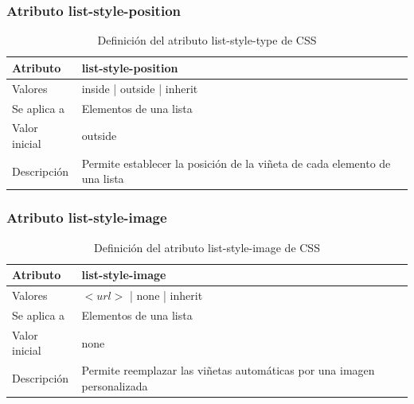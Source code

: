 \documentclass[ucs]{beamer}
\begin{document}

\begin{frame}
\frametitle{Atributo list-style-position}

\begin{center}
  \begin{table}
   \begin{tabular}{p{1.8cm}p{7.8cm}}
Atributo & \bf{list-style-position} \\ \hline
Valores& inside | outside | inherit \\ \hline
Se aplica a& Elementos de una lista \\ \hline
Valor inicial& outside \\ \hline
Descripción& Permite establecer la posición de la viñeta de cada elemento de una lista \\ \hline
  \end{tabular}
   \caption{Definición del atributo list-style-type de CSS}
 \end{table}
\end{center}


\end{frame}



\begin{frame}
\frametitle{Atributo list-style-image}

\begin{center}
  \begin{table}
   \begin{tabular}{p{1.8cm}p{7.8cm}}
Atributo & \bf{list-style-image} \\ \hline
Valores& $<url>$ | none | inherit \\ \hline
Se aplica a& Elementos de una lista \\ \hline
Valor inicial& none \\ \hline
Descripción& Permite reemplazar las viñetas automáticas por una imagen personalizada \\ \hline
  \end{tabular}
   \caption{Definición del atributo list-style-image de CSS}
 \end{table}
\end{center}


\end{frame}


\end{document}
